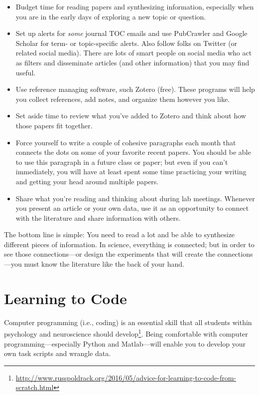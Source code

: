 \documentclass[letterpaper,11pt,oneside]{memoir}
\begin{document}
\begin{itemize}
\item Budget time for reading papers and synthesizing information, especially when you are in the early days of exploring a new topic or question. 
\item Set up alerts for \textit{some} journal TOC emails and use PubCrawler and Google Scholar for term- or topic-specific alerts. Also follow folks on Twitter (or related social media). There are lots of smart people on social media who act as filters and disseminate articles (and other information) that you may find useful.
\item Use reference managing software, such Zotero (free). These programs will help you collect references, add notes, and organize them however you like. 
\item Set aside time to review what you've added to Zotero and think about how those papers fit together.
\item Force yourself to write a couple of cohesive paragraphs each month that connects the dots on some of your favorite recent papers. You should be able to use this paragraph in a future class or paper; but even if you can't immediately, you will have at least spent some time practicing your writing and getting your head around multiple papers.
\item Share what you're reading and thinking about during lab meetings. Whenever you present an article or your own data, use it as an opportunity to connect with the literature and share information with others. 
\end{itemize}

\begin{shaded}
\noindent The bottom line is simple: You need to read a lot and be able to synthesize different pieces of information. In science, everything is connected; but in order to see those connections---or design the experiments that will create the connections---you must know the literature like the back of your hand.
\end{shaded}


\section{Learning to Code}
\label{sec:coding}

Computer programming (i.e., coding) is an essential skill that all students within psychology and neuroscience should develop\footnote{\url{http://www.russpoldrack.org/2016/05/advice-for-learning-to-code-from-scratch.html}}. Being comfortable with computer programming---especially Python and Matlab---will enable you to develop your own task scripts and wrangle data. 
\end{document}
